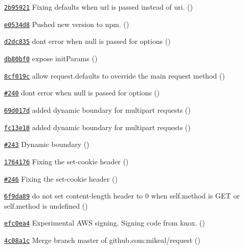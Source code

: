 \begin{DoxyItemize}
\item \href{https://github.com/mikeal/request/commit/2b959217151aaff7a6e7cc15e2acfccd1bbb9b85}{\tt 2b95921} Fixing defaults when url is passed instead of uri. ()
\item \href{https://github.com/mikeal/request/commit/e0534d860b4931a7a6e645b328fd4418a5433057}{\tt e0534d8} Pushed new version to npm. ()
\item \href{https://github.com/mikeal/request/commit/d2dc83538379e9e1fafb94f5698c56b4a5318d8d}{\tt d2dc835} don\textquotesingle{}t error when null is passed for options ()
\item \href{https://github.com/mikeal/request/commit/db80bf0444bd98c45f635f305154b9da20eed328}{\tt db80bf0} expose init\+Params ()
\item \href{https://github.com/mikeal/request/commit/8cf019c9f9f719694408840823e92da08ab9dac3}{\tt 8cf019c} allow request.\+defaults to override the main request method ()
\item \href{https://github.com/mikeal/request/pull/240}{\tt \#240} don\textquotesingle{}t error when null is passed for options ()
\item \href{https://github.com/mikeal/request/commit/69d017de57622429f123235cc5855f36b3e18d1c}{\tt 69d017d} added dynamic boundary for multipart requests ()
\item \href{https://github.com/mikeal/request/commit/fc13e185f5e28a280d347e61622ba708e1cd7bbc}{\tt fc13e18} added dynamic boundary for multipart requests ()
\item \href{https://github.com/mikeal/request/pull/243}{\tt \#243} Dynamic boundary ()
\item \href{https://github.com/mikeal/request/commit/176417698a84c53c0a69bdfd2a05a2942919816c}{\tt 1764176} Fixing the set-\/cookie header ()
\item \href{https://github.com/mikeal/request/pull/246}{\tt \#246} Fixing the set-\/cookie header ()
\item \href{https://github.com/mikeal/request/commit/6f9da89348b848479c23192c04b3c0ddd5a4c8bc}{\tt 6f9da89} do not set content-\/length header to 0 when self.\+method is G\+E\+T or self.\+method is undefined ()
\item \href{https://github.com/mikeal/request/commit/efc0ea44d63372a30011822ad9d37bd3d7b85952}{\tt efc0ea4} Experimental A\+W\+S signing. Signing code from knox. ()
\item \href{https://github.com/mikeal/request/commit/4c08a1c10bc0ebb679e212ad87419f6c4cc341eb}{\tt 4c08a1c} Merge branch \textquotesingle{}master\textquotesingle{} of github.\+com\+:mikeal/request ()

\end{DoxyItemize}
